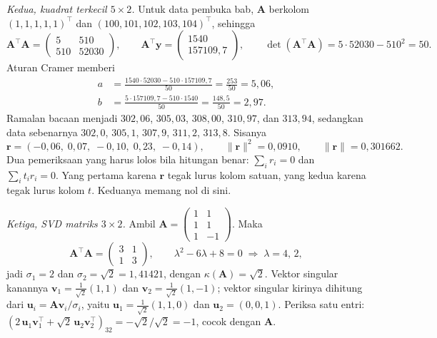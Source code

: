 \emph{Kedua, kuadrat terkecil $5\times2$.} Untuk data pembuka bab,
$\mathbf{A}$ berkolom $(1,1,1,1,1)^{\top}$ dan $(100,101,102,103,104)^{\top}$, sehingga
\[
  \mathbf{A}^{\top}\mathbf{A}=
  \begin{pmatrix}5&510\\ 510&52030\end{pmatrix},
  \qquad
  \mathbf{A}^{\top}\mathbf{y}=\begin{pmatrix}1540\\ 157109{,}7\end{pmatrix},
  \qquad
  \det(\mathbf{A}^{\top}\mathbf{A})=5\cdot52030-510^{2}=50 .
\]
Aturan Cramer memberi
\begin{align*}
  a&=\frac{1540\cdot52030-510\cdot157109{,}7}{50}=\frac{253}{50}=5{,}06,\\
  b&=\frac{5\cdot157109{,}7-510\cdot1540}{50}=\frac{148{,}5}{50}=2{,}97 .
\end{align*}
Ramalan bacaan menjadi $302{,}06$, $305{,}03$, $308{,}00$, $310{,}97$, dan $313{,}94$,
sedangkan data sebenarnya $302{,}0$, $305{,}1$, $307{,}9$, $311{,}2$, $313{,}8$. Sisanya
\[
  \mathbf{r}=(-0{,}06,\;0{,}07,\;-0{,}10,\;0{,}23,\;-0{,}14),
  \qquad
  \|\mathbf{r}\|^{2}=0{,}0910,\qquad \|\mathbf{r}\|=0{,}301662 .
\]
Dua pemeriksaan yang harus lolos bila hitungan benar: $\sum_{i}r_{i}=0$ dan
$\sum_{i}t_{i}r_{i}=0$. Yang pertama karena $\mathbf{r}$ tegak lurus kolom satuan, yang
kedua karena tegak lurus kolom $t$. Keduanya memang nol di sini.

\emph{Ketiga, SVD matriks $3\times2$.} Ambil
$\mathbf{A}=\begin{pmatrix}1&1\\ 1&1\\ 1&-1\end{pmatrix}$. Maka
\[
  \mathbf{A}^{\top}\mathbf{A}=\begin{pmatrix}3&1\\ 1&3\end{pmatrix},
  \qquad
  \lambda^{2}-6\lambda+8=0\;\Longrightarrow\;\lambda=4,\,2,
\]
jadi $\sigma_{1}=2$ dan $\sigma_{2}=\sqrt{2}=1{,}41421$, dengan
$\kappa(\mathbf{A})=\sqrt{2}$. Vektor singular kanannya
$\mathbf{v}_{1}=\frac{1}{\sqrt{2}}(1,1)$ dan
$\mathbf{v}_{2}=\frac{1}{\sqrt{2}}(1,-1)$; vektor singular kirinya dihitung dari
$\mathbf{u}_{i}=\mathbf{A}\mathbf{v}_{i}/\sigma_{i}$, yaitu
$\mathbf{u}_{1}=\frac{1}{\sqrt{2}}(1,1,0)$ dan $\mathbf{u}_{2}=(0,0,1)$. Periksa satu entri:
$(2\,\mathbf{u}_{1}\mathbf{v}_{1}^{\top}+\sqrt{2}\,\mathbf{u}_{2}\mathbf{v}_{2}^{\top})_{32}
=-\sqrt{2}/\sqrt{2}=-1$, cocok dengan $\mathbf{A}$.

